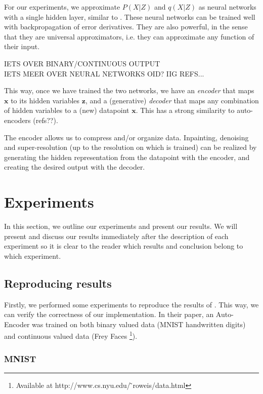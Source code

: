 \documentclass{article}
\begin{document}
For our experiments, we approximate $P(X|Z)$ and $q(X|Z)$ as neural networks with a single hidden layer, similar to \cite{kingma2013auto}. These neural networks can be trained well with backpropagation of error derivatives. They are also powerful, in the sense that they are universal approximators, i.e. they can approximate any function of their input. 

IETS OVER BINARY/CONTINUOUS OUTPUT \\
IETS MEER OVER NEURAL NETWORKS OID? IIG REFS...

This way, once we have trained the two networks, we have an \textit{encoder} that maps $\mathbf{x}$ to its hidden variables $\mathbf{z}$, and a (generative) \textit{decoder} that maps any combination of hidden variables to a (new) datapoint $\mathbf{x}$. This has a strong similarity to auto-encoders (refs??). 

The encoder allows us to compress and/or organize data. Inpainting, denoising and super-resolution (up to the resolution on which is trained) can be realized by generating the hidden representation from the datapoint with the encoder, and creating the desired output with the decoder.

\section{Experiments}

In this section, we outline our experiments and present our results. We will present and discuss our results immediately after the description of each experiment so it is clear to the reader which results and conclusion belong to which experiment.

\subsection{Reproducing results}

Firstly, we performed some experiments to reproduce the results of \cite{kingma2013auto}. This way, we can verify the correctness of our implementation. In their paper, an Auto-Encoder was trained on both binary valued data (MNIST handwritten digits) and continuous valued data (Frey Faces \footnote{Available at http://www.cs.nyu.edu/ ̃roweis/data.html}).

\subsubsection{MNIST}
\end{document}
